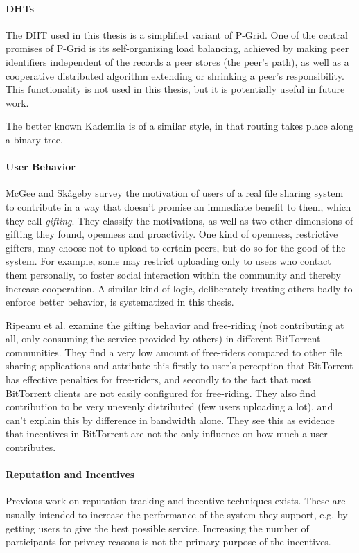 \paragraph{DHTs}
The \ac{DHT} used in this thesis is a simplified variant of
P-Grid\cite{aberer2001pgrid}. One of the central promises of P-Grid is its
self-organizing load balancing, achieved by making peer identifiers independent
of the records a peer stores (the peer's path), as well as a cooperative
distributed algorithm extending or shrinking a peer's responsibility. This
functionality is not used in this thesis, but it is potentially useful in future
work.

The better known Kademlia\cite{maymounkov2002kademlia} is of a similar style, in
that routing takes place along a binary tree.

\paragraph{User Behavior}
McGee and Sk{\aa}geby\cite{mcgee2004gifting} survey the motivation of users of a
real file sharing system to contribute in a way that doesn't promise an
immediate benefit to them, which they call \emph{gifting}. They classify the
motivations, as well as two other dimensions of gifting they found, openness and
proactivity. One kind of openness, restrictive gifters, may choose not to upload
to certain peers, but do so for the good of the system. For example, some may
restrict uploading only to users who contact them personally, to foster social
interaction within the community and thereby increase cooperation. A similar
kind of logic, deliberately treating others badly to enforce better behavior, is
systematized in this thesis.

Ripeanu et al.\cite{ripeanu2006gifting} examine the gifting behavior and
free-riding (not contributing at all, only consuming the service provided by
others) in different BitTorrent communities. They find a very low amount of
free-riders compared to other file sharing applications and attribute this
firstly to user's perception that BitTorrent has effective penalties for
free-riders, and secondly to the fact that most BitTorrent clients are not
easily configured for free-riding. They also find contribution to be very
unevenly distributed (few users uploading a lot), and can't explain this by
difference in bandwidth alone. They see this as evidence that incentives in
BitTorrent are not the only influence on how much a user contributes.

\paragraph{Reputation and Incentives}
Previous work on reputation tracking and incentive techniques exists. These are
usually intended to increase the performance of the system they support, e.g. by
getting users to give the best possible service. Increasing the number of
participants for privacy reasons is not the primary purpose of the incentives.


